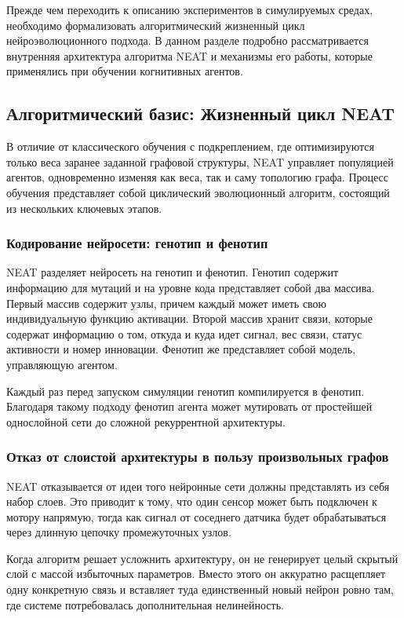 Прежде чем переходить к описанию экспериментов в симулируемых средах, необходимо формализовать алгоритмический жизненный цикл нейроэволюционного подхода. В данном разделе подробно рассматривается внутренняя архитектура алгоритма NEAT и механизмы его работы, которые применялись при обучении когнитивных агентов.

\subsection{Алгоритмический базис: Жизненный цикл NEAT}

В отличие от классического обучения с подкреплением, где оптимизируются только веса заранее заданной графовой структуры, NEAT управляет популяцией агентов, одновременно изменяя как веса, так и саму топологию графа. Процесс обучения представляет собой циклический эволюционный алгоритм, состоящий из нескольких ключевых этапов.

\subsubsection{Кодирование нейросети: генотип и фенотип}

NEAT разделяет нейросеть на генотип и фенотип. Генотип содержит информацию для мутаций и на уровне кода представляет собой два массива. Первый массив содержит узлы, причем каждый может иметь свою индивидуальную функцию активации. Второй массив хранит связи, которые содержат информацию о том, откуда и куда идет сигнал, вес связи, статус активности и номер инновации. Фенотип же представляет собой модель, управляющую агентом.

Каждый раз перед запуском симуляции генотип компилируется в фенотип. Благодаря такому подходу фенотип агента может мутировать от простейшей однослойной сети до сложной рекуррентной архитектуры.

\subsubsection{Отказ от слоистой архитектуры в пользу произвольных графов}

NEAT отказывается от идеи того нейронные сети должны представлять из себя набор слоев. Это приводит к тому, что один сенсор может быть подключен к мотору напрямую, тогда как сигнал от соседнего датчика будет обрабатываться через длинную цепочку промежуточных узлов.

Когда алгоритм решает усложнить архитектуру, он не генерирует целый скрытый слой с массой избыточных параметров. Вместо этого он аккуратно расщепляет одну конкретную связь и вставляет туда единственный новый нейрон ровно там, где системе потребовалась дополнительная нелинейность.


